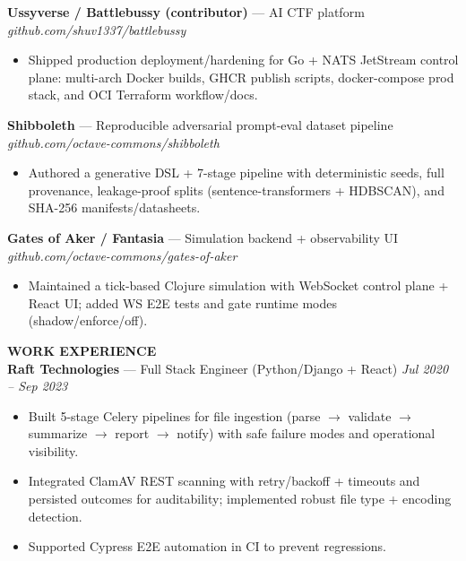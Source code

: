 \documentclass[10pt]{article}
\begin{document}
\textbf{Ussyverse / Battlebussy (contributor)} --- AI CTF platform \hfill \textit{github.com/shuv1337/battlebussy}\\
\vspace{-6pt}
\begin{itemize}
  \setlength\itemsep{-2pt}
  \setlength\parskip{0pt}
  \setlength\parsep{0pt}
  \item Shipped production deployment/hardening for Go + NATS JetStream control plane: multi-arch Docker builds, GHCR publish scripts, docker-compose prod stack, and OCI Terraform workflow/docs.
\end{itemize}

\textbf{Shibboleth} --- Reproducible adversarial prompt-eval dataset pipeline \hfill \textit{github.com/octave-commons/shibboleth}\\
\vspace{-6pt}
\begin{itemize}
  \setlength\itemsep{-2pt}
  \setlength\parskip{0pt}
  \setlength\parsep{0pt}
  \item Authored a generative DSL + 7-stage pipeline with deterministic seeds, full provenance, leakage-proof splits (sentence-transformers + HDBSCAN), and SHA-256 manifests/datasheets.
\end{itemize}

\textbf{Gates of Aker / Fantasia} --- Simulation backend + observability UI \hfill \textit{github.com/octave-commons/gates-of-aker}\\
\vspace{-6pt}
\begin{itemize}
  \setlength\itemsep{-2pt}
  \setlength\parskip{0pt}
  \setlength\parsep{0pt}
  \item Maintained a tick-based Clojure simulation with WebSocket control plane + React UI; added WS E2E tests and gate runtime modes (shadow/enforce/off).
\end{itemize}

\vspace{4pt}
\textbf{WORK EXPERIENCE}\\

\textbf{Raft Technologies} --- Full Stack Engineer (Python/Django + React) \hfill \textit{Jul 2020 -- Sep 2023}\\
\vspace{-6pt}
\begin{itemize}
  \setlength\itemsep{-2pt}
  \setlength\parskip{0pt}
  \setlength\parsep{0pt}
  \item Built 5-stage Celery pipelines for file ingestion (parse $\rightarrow$ validate $\rightarrow$ summarize $\rightarrow$ report $\rightarrow$ notify) with safe failure modes and operational visibility.
  \item Integrated ClamAV REST scanning with retry/backoff + timeouts and persisted outcomes for auditability; implemented robust file type + encoding detection.
  \item Supported Cypress E2E automation in CI to prevent regressions.
\end{itemize}
\end{document}
